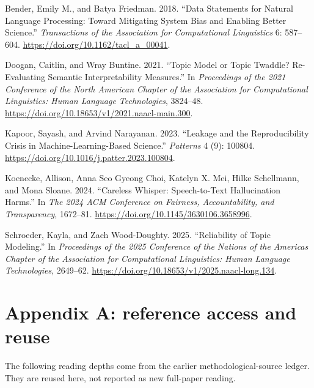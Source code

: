 \documentclass[
  11pt,
]{article}
\newlength{\cslhangindent}
\newenvironment{CSLReferences}[2] %
 {\begin{list}{}{%
  \setlength{\itemindent}{0pt}
  \setlength{\leftmargin}{0pt}
  \setlength{\parsep}{0pt}
  \ifodd #1
   \setlength{\leftmargin}{\cslhangindent}
   \setlength{\itemindent}{-1\cslhangindent}
  \fi
  \setlength{\itemsep}{#2\baselineskip}}}
 {\end{list}}
\begin{document}
\label{refs}
\begin{CSLReferences}{1}{0}
Bender, Emily M., and Batya Friedman. 2018. {``Data Statements for
Natural Language Processing: Toward Mitigating System Bias and Enabling
Better Science.''} \emph{Transactions of the Association for
Computational Linguistics} 6: 587--604.
\url{https://doi.org/10.1162/tacl_a_00041}.

Doogan, Caitlin, and Wray Buntine. 2021. {``Topic Model or Topic
Twaddle? Re-Evaluating Semantic Interpretability Measures.''} In
\emph{Proceedings of the 2021 Conference of the North American Chapter
of the Association for Computational Linguistics: Human Language
Technologies}, 3824--48.
\url{https://doi.org/10.18653/v1/2021.naacl-main.300}.

Kapoor, Sayash, and Arvind Narayanan. 2023. {``Leakage and the
Reproducibility Crisis in Machine-Learning-Based Science.''}
\emph{Patterns} 4 (9): 100804.
\url{https://doi.org/10.1016/j.patter.2023.100804}.

Koenecke, Allison, Anna Seo Gyeong Choi, Katelyn X. Mei, Hilke
Schellmann, and Mona Sloane. 2024. {``Careless Whisper: Speech-to-Text
Hallucination Harms.''} In \emph{The 2024 ACM Conference on Fairness,
Accountability, and Transparency}, 1672--81.
\url{https://doi.org/10.1145/3630106.3658996}.

Schroeder, Kayla, and Zach Wood-Doughty. 2025. {``Reliability of Topic
Modeling.''} In \emph{Proceedings of the 2025 Conference of the Nations
of the Americas Chapter of the Association for Computational
Linguistics: Human Language Technologies}, 2649--62.
\url{https://doi.org/10.18653/v1/2025.naacl-long.134}.

\end{CSLReferences}

\clearpage

\section{Appendix A: reference access and
reuse}\label{appendix-a-reference-access-and-reuse}

The following reading depths come from the earlier methodological-source
ledger. They are reused here, not reported as new full-paper reading.
\end{document}
